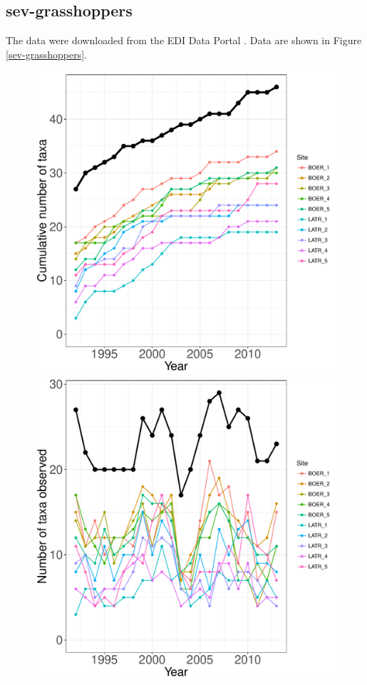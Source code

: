 \documentclass[11pt, oneside]{article}
\begin{document}
\subsection {sev-grasshoppers}
The data were downloaded from the EDI Data Portal \citep{sev-grasshopper}.
Data are shown in Figure \ref{sev-grasshoppers}.
  

\begin{figure}[h!]
\centering
\includegraphics[scale = 0.4]{sev-grasshopper-compagnoni_species_accumulation_curve.pdf}
\includegraphics[scale = 0.4]{sev-grasshopper-compagnoni_num_taxa_over_time.pdf}

\end{figure}
\end{document}
